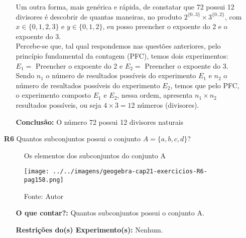 \documentclass[a4paper,12pt]{article}
\begin{document}
\begin{enumerate}
\begin{itemize}
    Um outra forma, mais genérica e rápida, de constatar que 72 possui 12 divisores é descobrir de quantas maneiras, no produto $2^{\{0..3\}} \times 3^{\{0..2\}} $, com $x \in \{0,1,2,3\}$ e $y \in \{0,1,2\}$, eu posso preencher o expoente do 2 e o expoente do 3. \\Percebe-se que, tal qual respondemos nas questões anteriores, pelo princípio fundamental da contagem (PFC), temos dois experimentos: $E_1 =$ Preencher o expoente do 2 e $E_2 =$ Preencher o expoente do 3. Sendo $n_{1}$ o número de resultados possíveis do experimento $E_1$ e $n_{2}$ o número de resultados possíveis do experimento $E_2$, temos que pelo PFC, o experimento composto $E_1$ e $E_2$, nessa ordem, apresenta $n_{1} \times n_{2}$ resultados possíveis, ou seja $4 \times 3 = 12$ números (divisores).
       
    \item[\ding{178}] \textbf{Conclusão:} O número 72 possui 12 divisores naturais
  \end{itemize}
  
\item[\textbf{R6}] Quantos subconjuntos possui o conjunto $A = \{a,b,c,d\}$?

    \begin{figure}[htb]
      \centering
      \caption{Os elementos dos subconjuntos do conjunto A}
      \texttt{[image: ../../imagens/geogebra-cap21-exercicios-R6-pag158.png]}
      \caption*{Fonte: Autor}
      \label{geogebra-cap21-exercicios-R6-pag158}
    \end{figure}


   \begin{itemize}
    \item[\ding{172}] \textbf{O que contar?:} Quantos subconjuntos possui o conjunto A.

    
    
    \item[\ding{173}] \textbf{Restrições do(s) Experimento(s):} Nenhum.
    

\end{itemize}
\end{enumerate}
\end{document}
